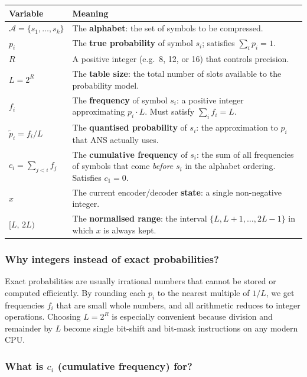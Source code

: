 \begin{center}
\renewcommand{\arraystretch}{1.3}
\begin{tabular}{@{}lp{10cm}@{}}
\toprule
\textbf{Variable} & \textbf{Meaning} \\
\midrule
$\mathcal{A} = \{s_1,\ldots,s_k\}$
  & The \textbf{alphabet}: the set of symbols to be compressed. \\
$p_i$
  & The \textbf{true probability} of symbol $s_i$; satisfies
    $\sum_i p_i = 1$. \\
$R$
  & A positive integer (e.g.\ 8, 12, or 16) that controls
    precision. \\
$L = 2^R$
  & The \textbf{table size}: the total number of slots
    available to the probability model. \\
$f_i$
  & The \textbf{frequency} of symbol $s_i$: a positive integer
    approximating $p_i \cdot L$.  Must satisfy $\sum_i f_i = L$. \\
$\tilde{p}_i = f_i / L$
  & The \textbf{quantised probability} of $s_i$: the
    approximation to $p_i$ that ANS actually uses. \\
$c_i = \sum_{j < i} f_j$
  & The \textbf{cumulative frequency} of $s_i$: the sum of
    all frequencies of symbols that come \emph{before} $s_i$
    in the alphabet ordering.  Satisfies $c_1 = 0$. \\
$x$
  & The current encoder/decoder \textbf{state}: a single
    non-negative integer. \\
$[L,\,2L)$
  & The \textbf{normalised range}: the interval $\{L, L{+}1,
    \ldots, 2L{-}1\}$ in which $x$ is always kept. \\
\bottomrule
\end{tabular}
\end{center}

\subsubsection*{Why integers instead of exact probabilities?}

Exact probabilities are usually irrational numbers that cannot
be stored or computed efficiently.  By rounding each $p_i$ to
the nearest multiple of $1/L$, we get frequencies $f_i$ that
are small whole numbers, and all arithmetic reduces to
integer operations.  Choosing $L = 2^R$ is especially
convenient because division and remainder by $L$ become
single bit-shift and bit-mask instructions on any modern CPU.

\subsubsection*{What is $c_i$ (cumulative frequency) for?}

